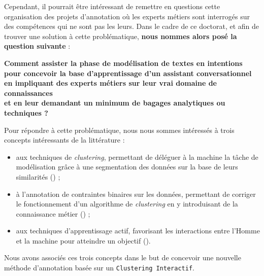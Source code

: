 	
	Cependant, il pourrait être intéressant de remettre en questions cette organisation des projets d'annotation où les experts métiers sont interrogés sur des compétences qui ne sont pas les leurs.
	Dans le cadre de ce doctorat, et afin de trouver une solution à cette problématique, \textbf{nous nommes alors posé la question suivante} :
	\begin{leftBarImportantGreen}
		\begin{center}
		\textbf{
			Comment assister la phase de modélisation de textes en intentions \\
			pour concevoir la base d'apprentissage d'un assistant conversationnel \\
			en impliquant des experts métiers sur leur vrai domaine de connaissances \\
			et en leur demandant un minimum de bagages analytiques ou techniques ?
		}
		\end{center}
	\end{leftBarImportantGreen}
	
	
	\begin{leftBarIdea}
		Pour répondre à cette problématique, nous nous sommes intéressés à trois concepts intéressants de la littérature :
		\begin{itemize}
			\item aux techniques de \textit{clustering}, permettant de déléguer à la machine la tâche de modélisation grâce à une segmentation des données sur la base de leurs similarités (\cite{xu-tian:2015:comprehensive-survey-clustering}) ;
			\item à l'annotation de contraintes binaires sur les données, permettant de corriger le fonctionnement d'un algorithme de \textit{clustering} en y introduisant de la connaissance métier (\cite{lampert-etal:2018:constrained-distance-based}) ;
			\item aux techniques d'apprentissage actif, favorisant les interactions entre l'Homme et la machine pour atteindre un objectif (\cite{settles:2010:active-learning-literature}).
		\end{itemize}
		Nous avons associés ces trois concepts dans le but de concevoir une nouvelle méthode d'annotation basée sur un \texttt{Clustering Interactif}.
	\end{leftBarIdea}